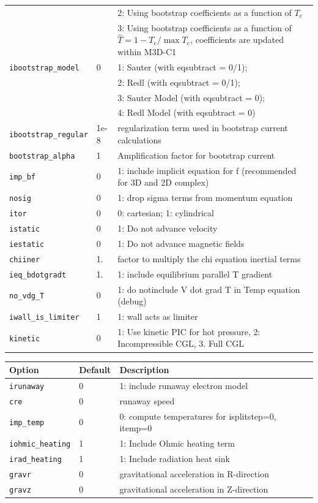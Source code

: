 \begin{tabular}{llp{4in}}
                      &   & 2: Using bootstrap coefficients as a function of $T_e$ \\
                      &   & 3: Using bootstrap coefficients as a function of $\hat{T}=1-T_e/\max{T_e}$, coefficients are updated within M3D-C1 \\
  \texttt{ibootstrap\_model} & 0 & 1: Sauter (with eqsubtract = 0/1); \\
                             &   & 2: Redl (with eqsubtract = 0/1); \\
                             &   & 3: Sauter Model (with eqsubtract = 0); \\
                             &   & 4: Redl Model (with eqsubtract = 0) \\
  \texttt{ibootstrap\_regular} & 1e-8 & regularization term used in bootstrap current calculations \\
  \texttt{bootstrap\_alpha} & 1 & Amplification factor for bootstrap current \\
  \texttt{imp\_bf} & 0 & 1: include implicit equation for f (recommended for
  3D and 2D complex) \\
  \texttt{nosig} & 0 & 1: drop sigma terms from momentum equation \\
  \texttt{itor}   & 0   & 0: cartesian; 1: cylindrical\\
  \texttt{istatic}& 0   & 1: Do not advance velocity\\
  \texttt{iestatic}&0   & 1: Do not advance magnetic fields\\
  \texttt{chiiner} & 1. & factor to multiply the chi equation inertial terms \\
  \texttt{ieq\_bdotgradt} & 1. & 1: include equilibrium parallel T gradient \\
  \texttt{no\_vdg\_T} & 0 & 1: do notinclude V dot grad T in Temp equation (debug) \\
  \texttt{iwall\_is\_limiter} & 1 & 1: wall acts as limiter \\
  \texttt{kinetic} & 0 & 1: Use kinetic PIC for hot pressure, 
                         2: Incompressible CGL,
                         3. Full CGL  
\end{tabular}

\begin{tabular}{llp{4in}}
  \textbf{Option}&\textbf{Default}&\textbf{Description}\\
  \hline
  \texttt{irunaway} & 0 & 1:  include runaway electron model \\
  \texttt{cre} & 0 & runaway speed \\
  \texttt{imp\_temp} & 0 & 0: compute temperatures for isplitstep=0, itemp=0 \\
  \texttt{iohmic\_heating} & 1 & 1: Include Ohmic heating term\\
  \texttt{irad\_heating} & 1 & 1: Include radiation heat sink \\
  \texttt{gravr} & 0 & gravitational acceleration in R-direction \\
  \texttt{gravz} & 0 & gravitational acceleration in Z-direction 
\end{tabular}

